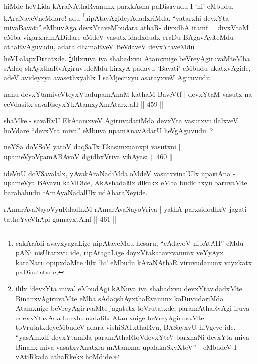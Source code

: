 \begin{artha}
hiMde heVLida kAraNAthaRvanunx parxkAsha paDisuvudu I `hi' eMbudu,
kAraNaveVneMdare! adu \footnote{cakArAdi avayxyagaLige nipAtaveMdu
  hesaru, ``cAdayoV nipAtAH'' eMdu pANi nisUtarxvu ide, nipAtagaLige
  doyxVtakatavxvanunx veYyAyx karaNaru opipxdaMte ililx `hi' eMbudu
  kAraNAthaR viruvudanunx vayxkatx paDisutatxde,}nipAtavAgideyAdadxriMda,
``yatarxhi devxYta mivaBavati'' eMbuvAga devxYtaveMbudara athaR-
divxdhA itamf = divxVtaM eMba vigarxhamADidare oMdeV vasutx idadxdudx
eraDu BAgavAyiteMdu athaRvAguvudu, adara dhamaRveV BeVdaveV
devxYtaveMdu heVLalapxDutatxde. \footnote{ililx `devxYta miva'
eMbudAgi kANuva iva shabadxvu devxYtavidadxMte BinanxvAgiruvaMte eMba
sAdaqshAyxthaRvanunx koDuvudariMda Atamxnige beVreyAgiruvaMte jagatutx
toVrutatxde, paramAthaRvAgi iruva adevxYtavAda barxhamxdalilx
Atamxnige beVreyAgiruvaMte toVrutatxdeyeMbudeV adara vishiSATxthaRvu,
BASayxvU hiVgeye ide. ``yasAmxdf devxYtamida paramAthaRtoV\s devxYteV
barxhaNi devxYta miva Binanx miva vasatxvXnatxra mAtamxna
upalakaSxyXteV'' - eMbudeV I vAtiRkada athaRkekx hoMdide.}ililxruva iva shabadxvu
Atamxnige beVreyAgiruvaMteMba sAdaq shAyxthaRvAgiruvudeMdu kirxyA
padavu `Bavati' eMbudu ukatxvAgide, adeV avideyxya avasethxyalilx I
saMjecnxyu asatayxveV Agiruvudu.
\end{artha}

\begin{shl}
nanu devxYtamiveVteyxVtadupamAnaM kathaM BaveVtf |
devxYtaM vasutx na ceVdasitx savaRseyxYkAtamxyXmAtarxtaH \hfill  || 459 ||
\end{shl}

\begin{artha}
shaMke - savaRvU EkAtamxveV AgiruvadariMda devxYta vasutxvu ilalxveV hoVdare ``devxYta miva'' eMbuva upamAnavAdarU heVgAguvudu~?
\end{artha}


\begin{shl}
neYSa doVSoV yatoV daqSaTx Ekasimxnanxpi vasutxni |
upameVyoVpamABAvoV digidhxVriva vihAyasi \hfill  || 460 ||
\end{shl}

\begin{artha}
ideVnU doVSavalalx, yAvakAraNadiMda oMdeV vasutxvinalUlx upamAna -
upameVya BAvavu kaMDide, AkAshadalilx dikukx eMba budidhxyu baruvaMte
barabahudu rAmAyaNadalUlx udAharaNeyide.
\end{artha}

\begin{shl}
rAmarAvaNayoVyuRdadhxM rAmarAvaNayoVriva |
yathA parxsidodhxV jagati tatheYveVhApi gamayxtAmf \hfill  || 461 ||
\end{shl}

